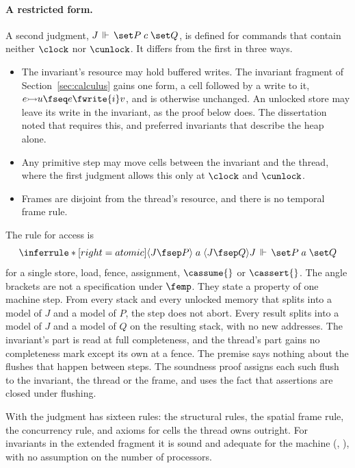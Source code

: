 \paragraph{A restricted form.}
A second judgment, $\bspec{J}{P}{c}{Q}$, is defined for commands that
contain neither $\clock$ nor $\cunlock$. It differs from the first in
three ways.
\begin{itemize}[nosep]
  \item The invariant's resource may hold buffered writes. The invariant
    fragment of Section~\ref{sec:calculus} gains one form, a cell followed
    by a write to it, $e \fcell u \fseq e \fwrite{i} v$, and is otherwise
    unchanged. An unlocked store may leave its write in the invariant, as
    the proof below does. The dissertation noted
    that  requires this, and preferred invariants that
    describe the heap alone.
  \item Any primitive step may move cells between the invariant and the
    thread, where the first judgment allows this only at $\clock$ and
    $\cunlock$.
  \item Frames are disjoint from the thread's resource, and there is no
    temporal frame rule.
\end{itemize}
The rule for access is
\[
  \inferrule*[right=atomic]
    {\langle J \fsep P \rangle\; a\; \langle J \fsep Q \rangle}
    {\bspec{J}{P}{a}{Q}}
\]
for a single store, load, fence, assignment, $\cassume{}$ or
$\cassert{}$. The angle brackets are not a specification under $\femp$.
They state a property of one machine step. From every stack and every
unlocked memory that splits into a model of $J$ and a model of $P$, the
step does not abort. Every result splits into a model of $J$ and a model
of $Q$ on the resulting stack, with no new addresses. The invariant's part
is read at full completeness, and the thread's part gains no completeness
mark except its own at a fence. The premise says nothing about the flushes
that happen between steps. The soundness proof assigns each such flush to
the invariant, the thread or the frame, and uses the fact that assertions
are closed under flushing.

With  the judgment has sixteen rules: the structural rules, the
spatial frame rule, the concurrency rule, and axioms for cells the thread
owns outright. For invariants in the extended fragment it is sound and
adequate for the machine
(, ), with
no assumption on the number of processors.

